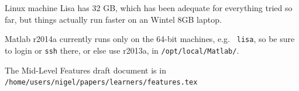 \documentclass[11pt]{article}
\begin{document}
Linux machine Lisa has 32 GB, which has been adequate for everything
tried so far, but things actually run faster on an Wintel 8GB laptop.

Matlab r2014a currently runs only on the 64-bit machines, e.g. {\tt
  lisa}, so be sure to login or {\tt ssh} there, or else use r2013a,
in {\tt /opt/local/Matlab/}.

The Mid-Level Features draft document is in
{\tt /home/users/nigel/papers/learners/features.tex}




\end{document}
